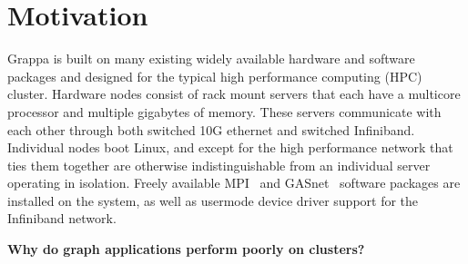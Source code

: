 \section{Motivation} \label{sec:motivation}

Grappa is built on many existing widely available hardware and software packages and designed for the typical high performance computing (HPC) cluster.  Hardware nodes consist of rack mount servers that each have a multicore processor and multiple gigabytes of memory.  These servers communicate with each other through both switched 10G ethernet and switched Infiniband.  Individual nodes boot Linux, and except for the high performance network that ties them together are otherwise indistinguishable from an individual server operating in isolation.  Freely available MPI~\cite{mpi} and GASnet~\cite{gasnet} software packages are installed on the system, as well as usermode device driver support for the Infiniband network.

\noindent\textbf{Why do graph applications perform poorly on clusters?}  

